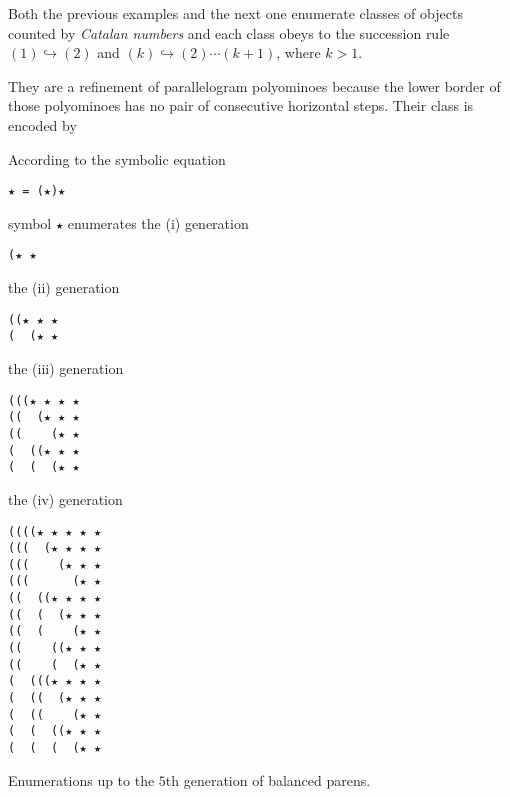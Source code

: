 
Both the previous examples and the next one enumerate classes of objects
counted by \textit{Catalan numbers} and each class obeys to the succession rule
$(1) \hookrightarrow (2)$ and $(k) \hookrightarrow (2)\cdots(k+1)$, where
$k>1$.

\begin{example} They are a refinement of
parallelogram polyominoes because the lower border of those polyominoes has no
pair of consecutive horizontal steps. Their class is encoded by

\begin{margintable}%
\noindent According to the symbolic equation
\begin{Verbatim}[baselinestretch=0.5]
★ = (★)★
\end{Verbatim}
symbol \verb|★| enumerates the (i) generation
\begin{Verbatim}[baselinestretch=0.5]
(★ ★
\end{Verbatim}
the (ii) generation
\begin{Verbatim}[baselinestretch=0.5]
((★ ★ ★
(  (★ ★
\end{Verbatim}
the (iii) generation
\begin{Verbatim}[baselinestretch=0.5]
(((★ ★ ★ ★
((  (★ ★ ★
((    (★ ★
(  ((★ ★ ★
(  (  (★ ★
\end{Verbatim}
the (iv) generation
\begin{Verbatim}[baselinestretch=0.5]
((((★ ★ ★ ★ ★
(((  (★ ★ ★ ★
(((    (★ ★ ★
(((      (★ ★
((  ((★ ★ ★ ★
((  (  (★ ★ ★
((  (    (★ ★
((    ((★ ★ ★
((    (  (★ ★
(  (((★ ★ ★ ★
(  ((  (★ ★ ★
(  ((    (★ ★
(  (  ((★ ★ ★
(  (  (  (★ ★
\end{Verbatim}
\caption{Enumerations up to the $5$th generation of balanced parens.}
\label{tbl:eco:balanced:parens}
\end{margintable}


\end{example}
